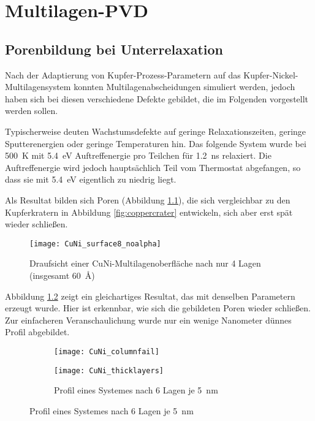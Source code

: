 \chapter{Multilagen-PVD}
\label{appendix:multilayer}

\section{Porenbildung bei Unterrelaxation}

Nach der Adaptierung von Kupfer-Prozess-Parametern auf das Kupfer-Nickel-Multilagensystem konnten Multilagenabscheidungen simuliert werden, jedoch haben sich bei diesen verschiedene Defekte gebildet, die im Folgenden vorgestellt werden sollen.

Typischerweise deuten Wachstumsdefekte auf geringe Relaxationszeiten, geringe Sputterenergien oder geringe Temperaturen hin.
Das folgende System wurde bei \SI{500}{\kelvin} mit \SI{5.4}{\electronvolt} Auftreffenergie pro Teilchen für \SI{1.2}{\nano\second} relaxiert.
Die Auftreffenergie wird jedoch hauptsächlich Teil vom Thermostat abgefangen, so dass sie mit \SI{5.4}{\electronvolt} eigentlich zu niedrig liegt.

Als Resultat bilden sich Poren (Abbildung \ref{fig:multilayer_surfacefail}), die sich vergleichbar zu den Kupferkratern in Abbildung \ref{fig:coppercrater} entwickeln, sich aber erst spät wieder schließen.

\begin{figure}[h]
  \centering
  \texttt{[image: CuNi\_surface8\_noalpha]}
  \caption{Draufsicht einer CuNi-Multi\-lagen\-ober\-fläche nach nur 4 Lagen (insgesamt \SI{60}{\angstrom})}
  \label{fig:multilayer_surfacefail}
\end{figure}

\clearpage
Abbildung \ref{fig:multilayer_columnfail} zeigt ein gleichartiges Resultat, das mit denselben Parametern erzeugt wurde.
Hier ist erkennbar, wie sich die gebildeten Poren wieder schließen.
Zur einfacheren Veranschaulichung wurde nur ein wenige Nanometer dünnes Profil abgebildet.

\begin{figure}[h]
  \caption{Profile fehlgeschlagener Simulationen von Multilagen-Abscheidungen}
  \captionsetup[subfigure]{singlelinecheck=false}
  \def\subfigwidth{7cm}
  \begin{subfigure}[t]{\subfigwidth}
    \texttt{[image: CuNi\_columnfail]}
    \label{fig:multilayer_columnfail}
  \end{subfigure}
  \hfill
  \begin{subfigure}[t]{\subfigwidth}
    \texttt{[image: CuNi\_thicklayers]}
    \caption{Profil eines Systemes nach 6 Lagen je \SI{5}{\nano\meter}}
    \label{fig:multilayer_thickfail}
  \end{subfigure}
\end{figure}

